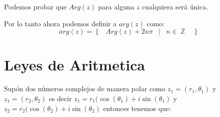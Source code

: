 \documentclass[12pt, fleqn]{report}                             %
\DeclareMathOperator \Space {\quad}                             %
\DeclareMathOperator \MiniSpace {\;}                            %
\newcommand \Such {\MiniSpace|\MiniSpace}                       %
\newcommand{\Set}[1]{\left\{ \MiniSpace #1 \MiniSpace \right\}} %
\newcommand{\Wrap}[1]{\left( #1 \right)}                        %
\DeclareMathOperator \Integers  {\mathbb{Z}}                     %
\newcommand{\Cos}[1]{\cos\Wrap{#1}}                             %
\newcommand{\Sin}[1]{\sin\Wrap{#1}}                             %
\begin{document}
                Podemos probar que $Arg(z)$ para alguna $z$ cualquiera será única.

                Por lo tanto ahora podemos definir a $arg(z)$ como:
                \begin{equation}
                    arg(z) = \Set{ Arg(z) + 2n\pi \Such n \in \Integers }
                \end{equation}


        \clearpage
        \section{Leyes de Aritmetica}
            
            Supón dos números complejos de manera polar como $z_1 = (r_1, \theta_1)$ y $z_1 = (r_2, \theta_2)$ 
            es decir $z_1 = r_1(\Cos{\theta_1} + i\Sin{\theta_1}$ y
            $z_2 = r_2(\Cos{\theta_2} + i\Sin{\theta_2}$ entonces tenemos que:
\end{document}
